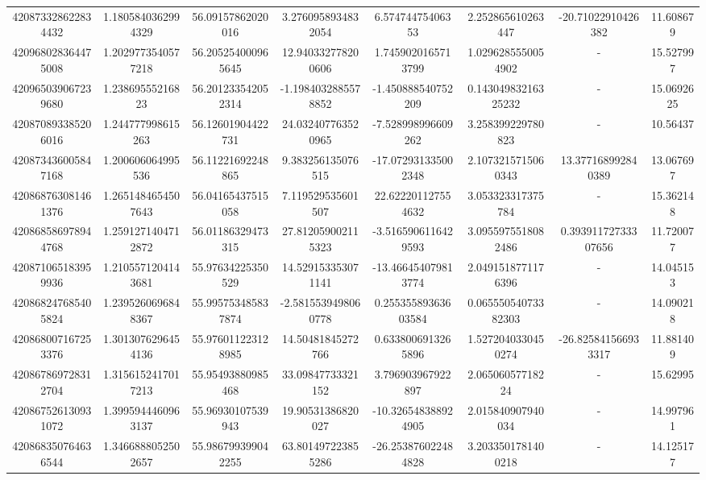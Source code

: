 \documentclass{article}
\begin{document}
\begin{landscape}
\begin{longtable}[c]{S[table-format=18.0]S[table-format=2.15]S[table-format=2.15]S[table-format=-2.17]S[table-format=-2.16]S[table-format=-2.16]S[table-format=-3.16]S[table-format=2.7]}
420873328622834432 & 1.1805840362994329 & 56.09157862020016  & 3.2760958934832054    & 6.57474475406353     & 2.252865610263447    & -20.71022910426382  & 11.608679  \\
420968028364475008 & 1.2029773540577218 & 56.205254000965645 & 12.940332778200606    & 1.7459020165713799   & 1.0296285550054902   & {-}                  & 15.527997  \\
420965039067239680 & 1.23869555216823   & 56.201233542052314 & -1.1984032885578852   & -1.450888540752209   & 0.14304983216325232  & {-}                  & 15.0692625 \\
420870893385206016 & 1.244777998615263  & 56.12601904422731  & 24.032407763520965    & -7.528998996609262   & 3.258399229780823    & {-}                  & 10.56437   \\
420873436005847168 & 1.200606064995536  & 56.11221692248865  & 9.383256135076515     & -17.072931335002348  & 2.1073215715060343   & 13.377168992840389  & 13.067697  \\
420868763081461376 & 1.2651484654507643 & 56.04165437515058  & 7.119529535601507     & 22.622201127554632   & 3.053323317375784    & {-}                  & 15.362148  \\
420868586978944768 & 1.2591271404712872 & 56.01186329473315  & 27.812059002115323    & -3.5165906116429593  & 3.0955975518082486   & 0.39391172733307656 & 11.720077  \\
420871065183959936 & 1.2105571204143681 & 55.97634225350529  & 14.529153353071141    & -13.466454079813774  & 2.0491518771176396   & {-}                  & 14.045153  \\
420868247685405824 & 1.2395260696848367 & 55.995753485837874 & -2.5815539498060778   & 0.25535589363603584  & 0.06555054073382303  & {-}                  & 14.090218  \\
420868007167253376 & 1.3013076296454136 & 55.976011223128985 & 14.50481845272766     & 0.6338006913265896   & 1.5272040330450274   & -26.825841566933317 & 11.881409  \\
420867869728312704 & 1.3156152417017213 & 55.95493880985468  & 33.09847733321152     & 3.796903967922897    & 2.06506057718224     & {-}                  & 15.62995   \\
420867526130931072 & 1.3995944460963137 & 55.96930107539943  & 19.90531386820027     & -10.326548388924905  & 2.015840907940034    & {-}                  & 14.997961  \\
420868350764636544 & 1.3466888052502657 & 55.986799399042255 & 63.801497223855286    & -26.253876022484828  & 3.2033501781400218   & {-}                  & 14.125177  \\

\end{longtable}
\end{landscape}
\end{document}
